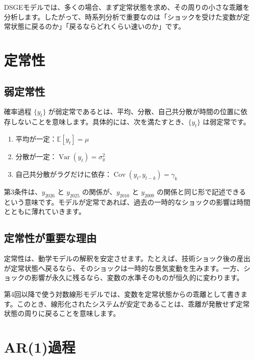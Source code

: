 \documentclass[
  japanese,
  lualatex,
  ja=standard,
  12pt,
  a4paper]{ltjsarticle}
\providecommand{\tightlist}{%
  \setlength{\itemsep}{0pt}\setlength{\parskip}{0pt}}
\begin{document}
DSGEモデルでは、多くの場合、まず定常状態を求め、その周りの小さな乖離を分析します。したがって、時系列分析で重要なのは「ショックを受けた変数が定常状態に戻るのか」「戻るならどれくらい速いのか」です。

\section{定常性}\label{ux5b9aux5e38ux6027}

\subsection{弱定常性}\label{ux5f31ux5b9aux5e38ux6027}

確率過程 \(\{y_t\}\)
が弱定常であるとは、平均、分散、自己共分散が時間の位置に依存しないことを意味します。具体的には、次を満たすとき、\(\{y_t\}\)
は弱定常です。

\begin{enumerate}
\def\labelenumi{\arabic{enumi}.}
\tightlist
\item
  平均が一定：\(\mathbb{E}[y_t]=\mu\)
\item
  分散が一定：\(\operatorname{Var}(y_t)=\sigma_y^2\)
\item
  自己共分散がラグだけに依存：\(\operatorname{Cov}(y_t,y_{t-k})=\gamma_k\)
\end{enumerate}

第3条件は、\(y_{2026}\) と \(y_{2025}\) の関係が、\(y_{2010}\) と
\(y_{2009}\)
の関係と同じ形で記述できるという意味です。モデルが定常であれば、過去の一時的なショックの影響は時間とともに薄れていきます。

\subsection{定常性が重要な理由}\label{ux5b9aux5e38ux6027ux304cux91cdux8981ux306aux7406ux7531}

定常性は、動学モデルの解釈を安定させます。たとえば、技術ショック後の産出が定常状態へ戻るなら、そのショックは一時的な景気変動を生みます。一方、ショックの影響が永久に残るなら、変数の水準そのものが恒久的に変わります。

第4回以降で使う対数線形モデルでは、変数を定常状態からの乖離として書きます。このとき、線形化されたシステムが安定であることは、乖離が発散せず定常状態の周りに戻ることを意味します。

\section{AR(1)過程}\label{ar1ux904eux7a0b}
\end{document}
